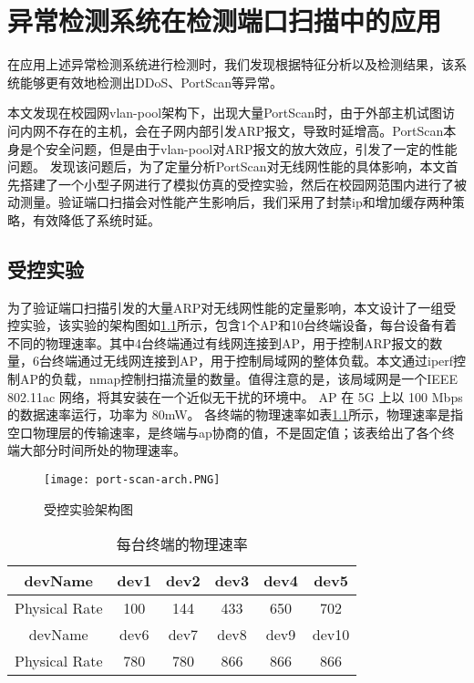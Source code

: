 \chapter{异常检测系统在检测端口扫描中的应用}
在应用上述异常检测系统进行检测时，我们发现根据特征分析以及检测结果，该系统能够更有效地检测出DDoS、PortScan等异常。

本文发现在校园网vlan-pool架构下，出现大量PortScan时，由于外部主机试图访问内网不存在的主机，会在子网内部引发ARP报文，导致时延增高。PortScan本身是个安全问题，但是由于vlan-pool对ARP报文的放大效应，引发了一定的性能问题。
发现该问题后，为了定量分析PortScan对无线网性能的具体影响，本文首先搭建了一个小型子网进行了模拟仿真的受控实验，然后在校园网范围内进行了被动测量。验证端口扫描会对性能产生影响后，我们采用了封禁ip和增加缓存两种策略，有效降低了系统时延。

\section{受控实验}
为了验证端口扫描引发的大量ARP对无线网性能的定量影响，本文设计了一组受控实验，该实验的架构图如\ref{fig:受控实验架构图}所示，包含1个AP和10台终端设备，每台设备有着不同的物理速率。其中4台终端通过有线网连接到AP，用于控制ARP报文的数量，6台终端通过无线网连接到AP，用于控制局域网的整体负载。本文通过iperf控制AP的负载，nmap控制扫描流量的数量。值得注意的是，该局域网是一个IEEE 802.11ac 网络，将其安装在一个近似无干扰的环境中。 AP 在 5G 上以 100 Mbps 的数据速率运行，功率为 80mW。 各终端的物理速率如表\ref{每台终端的物理速率}所示，物理速率是指空口物理层的传输速率，是终端与ap协商的值，不是固定值；该表给出了各个终端大部分时间所处的物理速率。

\begin{figure}
  \centering
  \texttt{[image: port-scan-arch.PNG]}
  \caption{受控实验架构图}
  \label{fig:受控实验架构图}
\end{figure}

\begin{table}[h] 
  \centering  %
  \caption{每台终端的物理速率}  %
  \label{每台终端的物理速率}
  \begin{tabular}{c|ccccc}
  \toprule  %
  devName&dev1&dev2&dev3&dev4&dev5\\
  \hline  %
  Physical Rate&100&144&433&650&702\\
  \bottomrule
  \toprule %
  devName&dev6&dev7&dev8&dev9&dev10\\
  \hline  %
  Physical Rate&780&780&866&866&866\\
  \bottomrule %
  \end{tabular}
  
  \end{table}

